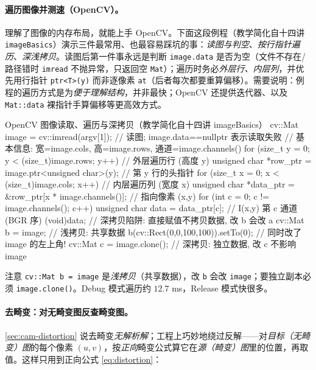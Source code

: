 \paragraph{遍历图像并测速（OpenCV）。}
理解了图像的内存布局，就能上手 OpenCV。下面这段例程（教学简化自十四讲 \texttt{imageBasics}\cite{gaoxiang2019slam14}）演示三件最常用、也最容易踩坑的事：\emph{读图与判空}、\emph{按行指针遍历}、\emph{深浅拷贝}。读图后第一件事永远是判断 \texttt{image.data} 是否为空（文件不存在/路径错时 \texttt{imread} 不抛异常，只返回空 \texttt{Mat}）；遍历时务必\emph{外层行、内层列}，并优先用行指针 \texttt{ptr<T>(y)} 而非逐像素 \texttt{at}（后者每次都要重算偏移）。需要说明：例程的遍历方式是为\emph{便于理解结构}，并非最快；OpenCV 还提供迭代器、以及 \texttt{Mat::data} 裸指针手算偏移等更高效方式。

\begin{codebox}[C++]{OpenCV 图像读取、遍历与深拷贝（教学简化自十四讲 imageBasics）}
cv::Mat image = cv::imread(argv[1]);              // 读图; image.data==nullptr 表示读取失败
// 基本信息: 宽=image.cols, 高=image.rows, 通道=image.channels()
for (size_t y = 0; y < (size_t)image.rows; y++) { // 外层遍历行 (高度 y)
  unsigned char *row_ptr = image.ptr<unsigned char>(y);  // 第 y 行的头指针
  for (size_t x = 0; x < (size_t)image.cols; x++) {       // 内层遍历列 (宽度 x)
    unsigned char *data_ptr = &row_ptr[x * image.channels()]; // 指向像素 (x,y)
    for (int c = 0; c != image.channels(); c++) {
      unsigned char data = data_ptr[c];           // I(x,y) 第 c 通道 (BGR 序)
      (void)data;
    }
  }
}
// 深拷贝陷阱: 直接赋值不拷贝数据, 改 b 会改 a
cv::Mat b = image;            // 浅拷贝: 共享数据
b(cv::Rect(0,0,100,100)).setTo(0);   // 同时改了 image 的左上角!
cv::Mat c = image.clone();    // 深拷贝: 独立数据, 改 c 不影响 image
\end{codebox}

\noindent 注意 \texttt{cv::Mat b = image} 是\emph{浅拷贝}（共享数据），改 \texttt{b} 会改 \texttt{image}；要独立副本必须 \texttt{image.clone()}。Debug 模式遍历约 $12.7$ ms，Release 模式快很多\cite{gaoxiang2019slam14}。

\paragraph{去畸变：对无畸变图反查畸变图。}
\cref{sec:cam-distortion} 说去畸变\emph{无解析解}；工程上巧妙地绕过反解——对\emph{目标（无畸变）图}的每个像素 $(u,v)$，按\emph{正向}畸变公式算它在\emph{源（畸变）图}里的位置，再取值。这样只用到正向公式 \cref{eq:distortion}：

